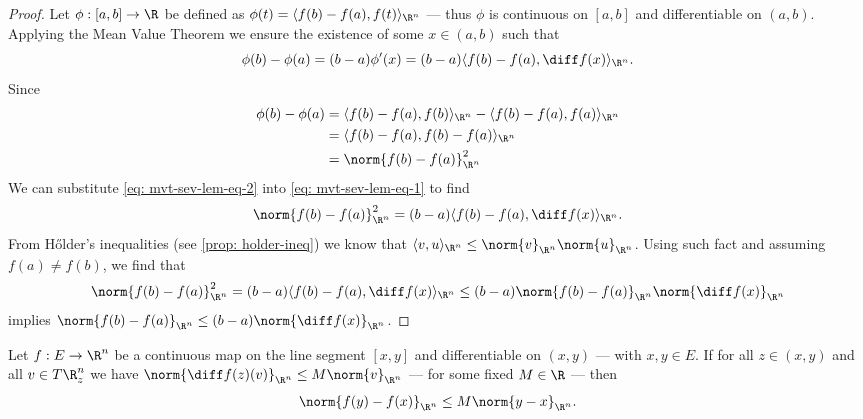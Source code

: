\begin{proof}
Let \(\phi: [a, b] \to \R\) be defined as \(\phi(t) = \langle f(b) - f(a), f(t) \rangle_{\R^n}\) ---
thus \(\phi\) is continuous on \([a, b]\) and differentiable on \((a, b)\).
Applying the Mean Value Theorem we ensure the existence of some \(x \in (a, b)\)
such that
  \begin{equation}
    \label{eq: mvt-sev-lem-eq-1}
    \phi(b) - \phi(a) = (b - a) \phi'(x)
    = (b - a) \langle f(b) - f(a), \diff f(x) \rangle_{\R^n}.
  \end{equation}
  Since
  \begin{align}
    \nonumber
    \phi(b) - \phi(a)
    &= \langle f(b) - f(a), f(b) \rangle_{\R^n} - \langle f(b) - f(a), f(a)
    \rangle_{\R^n} \\
    \nonumber
    &= \langle f(b) - f(a), f(b) - f(a) \rangle_{\R^n} \\
    \label{eq: mvt-sev-lem-eq-2}
    &= \norm{f(b) - f(a)}_{\R^n}^2
  \end{align}
  We can substitute \cref{eq: mvt-sev-lem-eq-2} into \cref{eq: mvt-sev-lem-eq-1}
  to find
  \[
    \norm{f(b) - f(a)}_{\R^n}^2 = (b - a) \langle f(b) - f(a), \diff f(x)
    \rangle_{\R^n}.
  \]
  From H\H{o}lder's inequalities (see \cref{prop: holder-ineq}) we know that
  \(\langle v, u \rangle_{\R^n} \leq \norm{v}_{\R^n} \norm{u}_{\R^n}\). Using
  such fact and assuming \(f(a) \neq f(b)\), we find that
  \begin{align*}
    \norm{f(b) - f(a)}_{\R^n}^2
    = (b - a) \langle f(b) - f(a), \diff f(x) \rangle_{\R^n}
    \leq (b - a) \norm{f(b) - f(a)}_{\R^n} \norm{\diff f(x)}_{\R^n}
  \end{align*}
  implies \(\norm{f(b) - f(a)}_{\R^n} \leq (b - a) \norm{\diff f(x)}_{\R^n}\).
\end{proof}

\begin{theorem}
  \label{thm: several-mvt-Rn-val}
  Let \(f: E \to \R^n\) be a continuous map on the line segment \([x, y]\) and
  differentiable on \((x, y)\) --- with \(x, y \in E\). If for all \(z \in (x,
  y)\) and all \(v \in T\R^n_z\) we have \(\norm{\diff f(z)(v)}_{\R^n} \leq M
  \norm{v}_{\R^n}\) --- for some fixed \(M \in \R\) --- then
  \[
    \norm{f(y) - f(x)}_{\R^n} \leq M \norm{y - x}_{\R^n}.
  \]
\end{theorem}

